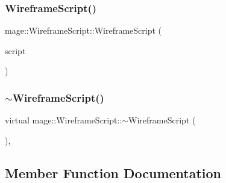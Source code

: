 \hypertarget{classmage_1_1_wireframe_script_a60fe0f3e02061654466c22d81919e6e1}{}\label{classmage_1_1_wireframe_script_a60fe0f3e02061654466c22d81919e6e1} 
\subsubsection{\texorpdfstring{Wireframe\+Script()}{WireframeScript()}\hspace{0.1cm}{\footnotesize\ttfamily [3/3]}}
{\footnotesize\ttfamily mage\+::\+Wireframe\+Script\+::\+Wireframe\+Script (\begin{DoxyParamCaption}\item[{\hyperlink{classmage_1_1_wireframe_script}{Wireframe\+Script} \&\&}]{script }\end{DoxyParamCaption})\hspace{0.3cm}{\ttfamily [default]}}

\hypertarget{classmage_1_1_wireframe_script_a0b6f33e5938125f915152fd9100625d6}{}\label{classmage_1_1_wireframe_script_a0b6f33e5938125f915152fd9100625d6} 
\subsubsection{\texorpdfstring{$\sim$\+Wireframe\+Script()}{~WireframeScript()}}
{\footnotesize\ttfamily virtual mage\+::\+Wireframe\+Script\+::$\sim$\+Wireframe\+Script (\begin{DoxyParamCaption}{ }\end{DoxyParamCaption})\hspace{0.3cm}{\ttfamily [virtual]}, {\ttfamily [default]}}



\subsection{Member Function Documentation}
\hypertarget{classmage_1_1_wireframe_script_a0382415dade9f889b1edebf2ee5aa770}{}\label{classmage_1_1_wireframe_script_a0382415dade9f889b1edebf2ee5aa770} 
